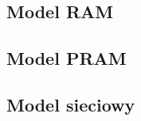 \subsection{Model RAM}


\label{subsec:PRAM}
\subsection{Model PRAM}


\subsection{Model sieciowy}


